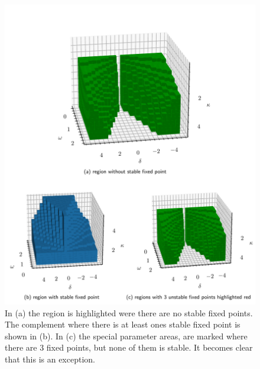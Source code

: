 \documentclass{article}
\begin{document}
\begin{figure}[H]
    \vspace{-0.35cm}
    \hspace*{-1.3cm}
    \includegraphics{pictures/stability_regions.pdf}
    \caption{In (a) the region is highlighted were there are no stable fixed points. The complement where there is at least ones stable fixed point is shown in (b). In (c) the special parameter areas, are marked where there are 3 fixed points, but none of them is stable. It becomes clear that this is an exception.}
\end{figure}
\end{document}
